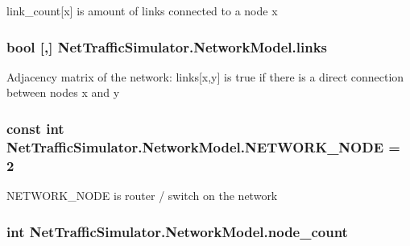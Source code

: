 link\-\_\-count\mbox{[}x\mbox{]} is amount of links connected to a node x \hypertarget{classNetTrafficSimulator_1_1NetworkModel_a01410c5733a30fb4e37208c8b94fdf8d}{
\subsubsection[{links}]{\setlength{\rightskip}{0pt plus 5cm}bool \mbox{[},\mbox{]} Net\-Traffic\-Simulator.\-Network\-Model.\-links\hspace{0.3cm}{\ttfamily [private]}}}\label{classNetTrafficSimulator_1_1NetworkModel_a01410c5733a30fb4e37208c8b94fdf8d}
Adjacency matrix of the network\-: links\mbox{[}x,y\mbox{]} is true if there is a direct connection between nodes x and y \hypertarget{classNetTrafficSimulator_1_1NetworkModel_ab2882fa4fe981780f78f822b12677f88}{
\subsubsection[{N\-E\-T\-W\-O\-R\-K\-\_\-\-N\-O\-D\-E}]{\setlength{\rightskip}{0pt plus 5cm}const int Net\-Traffic\-Simulator.\-Network\-Model.\-N\-E\-T\-W\-O\-R\-K\-\_\-\-N\-O\-D\-E = 2}}\label{classNetTrafficSimulator_1_1NetworkModel_ab2882fa4fe981780f78f822b12677f88}
N\-E\-T\-W\-O\-R\-K\-\_\-\-N\-O\-D\-E is router / switch on the network \hypertarget{classNetTrafficSimulator_1_1NetworkModel_a85f9941bb3af088bd078b273f0cb4e52}{
\subsubsection[{node\-\_\-count}]{\setlength{\rightskip}{0pt plus 5cm}int Net\-Traffic\-Simulator.\-Network\-Model.\-node\-\_\-count\hspace{0.3cm}{\ttfamily [private]}}}\label{classNetTrafficSimulator_1_1NetworkModel_a85f9941bb3af088bd078b273f0cb4e52}
